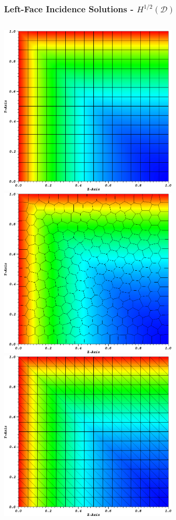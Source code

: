 \documentclass[compress,10pt]{beamer}
\begin{document}
\begin{frame}[t]
{
\frametitle{Left-Face Incidence Solutions - $H^{1/2} (\mathcal{D})$}
\begin{columns}
\centering
{}\includegraphics[width=0.65\textwidth]{images/PALeftTopSol_Cart.png} \\
{}\includegraphics[width=0.65\textwidth]{images/PALeftTopSol_Poly.png}
\centering
{}\includegraphics[width=0.65\textwidth]{images/PALeftTopSol_Tri.png} \\

\end{columns}}
\end{frame}
\end{document}
